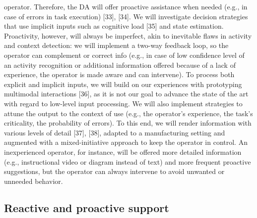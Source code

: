 operator. Therefore, the DA will offer proactive assistance when needed (e.g., in case of errors in task execution)
[33], [34]. We will investigate decision strategies that use implicit inputs such as cognitive load [35] and state
estimation. Proactivity, however, will always be imperfect, akin to inevitable flaws in activity and context detection:
we will implement a two-way feedback loop, so the operator can complement or correct info (e.g., in case of low
confidence level of an activity recognition or additional information offered because of a lack of experience, the
operator is made aware and can intervene). To process both explicit and implicit inputs, we will build on our
experiences with prototyping multimodal interactions [36], as it is not our goal to advance the state of the art with
regard to low-level input processing. We will also implement strategies to attune the output to the context of use
(e.g., the operator's experience, the task's criticality, the probability of errors). To this end, we will render information
with various levels of detail [37], [38], adapted to a manufacturing setting and augmented with a mixed-initiative
approach to keep the operator in control. An inexperienced operator, for instance, will be offered more detailed
information (e.g., instructional video or diagram instead of text) and more frequent proactive suggestions, but the
operator can always intervene to avoid unwanted or unneeded behavior.

\subsection{Reactive and proactive support} \label{sec:ReactiveProactive}


